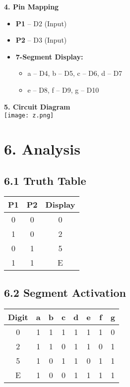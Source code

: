 \documentclass[12pt]{article}
\begin{document}
\begin{multicols}{2}
\vspace{1em}
\noindent\textbf{4. Pin Mapping}
\begin{itemize}
    \item \textbf{P1} – D2 (Input)
    \item \textbf{P2} – D3 (Input)
    \item \textbf{7-Segment Display:}
    \begin{itemize}
        \item a – D4, b – D5, c – D6, d – D7
        \item e – D8, f – D9, g – D10
    \end{itemize}
\end{itemize}

\vspace{1em}
\noindent\textbf{5. Circuit Diagram} \\
\texttt{[image: z.png]} %

\end{multicols}

\newpage

\vspace{1em}
\section*{6. Analysis}
\subsection*{6.1 Truth Table}
\begin{table}[H]
\centering
\begin{tabular}{|c|c|c|}
\hline
\textbf{P1} & \textbf{P2} & \textbf{Display} \\
\hline
0 & 0 & 0 \\
1 & 0 & 2 \\
0 & 1 & 5 \\
1 & 1 & E \\
\hline
\end{tabular}
\end{table}

\subsection*{6.2 Segment Activation}
\begin{table}[H]
\centering
\small
\begin{tabular}{|c|c|c|c|c|c|c|c|}
\hline
\textbf{Digit} & a & b & c & d & e & f & g \\
\hline
0 & 1 & 1 & 1 & 1 & 1 & 1 & 0 \\
2 & 1 & 1 & 0 & 1 & 1 & 0 & 1 \\
5 & 1 & 0 & 1 & 1 & 0 & 1 & 1 \\
E & 1 & 0 & 0 & 1 & 1 & 1 & 1 \\
\hline
\end{tabular}
\end{table}
\end{document}
